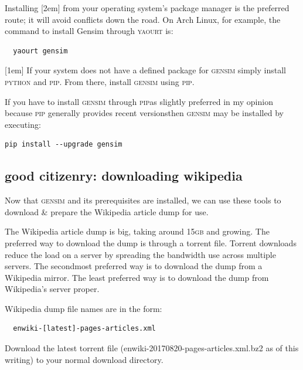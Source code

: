 Installing [2em] from your operating system's package manager is the preferred route; it will avoid conflicts down the road. On Arch Linux, for example, the command to install Gensim through \textsc{yaourt} is:
\begin{lstlisting}
  yaourt gensim
\end{lstlisting}

[1em]
If your system does not have a defined package for \textsc{gensim} simply
install \textsc{python} and \textsc{pip}. From there, install \textsc{gensim}
using \textsc{pip}.

If you have to install \textsc{gensim} through \textsc{pip}\textemdash as slightly
preferred in my opinion because \textsc{pip} generally provides recent versions\textemdash then
\textsc{gensim} may be installed by executing:

\begin{lstlisting}
pip install --upgrade gensim
\end{lstlisting}
\subsection{good citizenry: downloading wikipedia}
Now that \textsc{gensim} and its pre\textendash requisites are installed, we can
use these tools to download \& prepare the Wikipedia article dump
for use.

The Wikipedia article dump is big, taking around 15\textsc{gb} and growing. The
preferred way to download the dump is through a torrent file. Torrent downloads
reduce the load on a server by spreading the bandwidth use across multiple servers. The
second\textendash most preferred way is to download the dump from a Wikipedia mirror. The least
preferred way is to download the dump from Wikipedia's server proper.

Wikipedia dump file names are in the form:
\begin{lstlisting}
  enwiki-[latest]-pages-articles.xml
  \end{lstlisting}
Download the latest torrent file ({\small enwiki-20170820-pages-articles.xml.bz2} as of
this writing) to your normal download directory.

